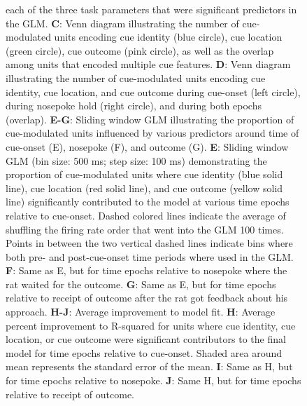 \documentclass[11pt]{article}
\newcommand{\bsf}[1]{\textbf{#1}}
\begin{document}
{\begin{figure}[h]
{each of the three task parameters that were significant predictors in the
GLM. \bsf{C}: Venn diagram illustrating the number of cue-modulated units encoding cue identity (blue circle), cue location (green circle), cue outcome (pink circle), as well as the overlap among units that encoded multiple cue features. \bsf{D}: Venn diagram illustrating the number of cue-modulated units encoding cue identity, cue location, and cue outcome during cue-onset (left circle), during nosepoke hold (right circle), and during both epochs (overlap). \bsf{E-G}: Sliding window GLM illustrating the proportion of cue-modulated units influenced by various predictors around time of cue-onset (E), nosepoke (F), and outcome (G). \bsf{E}: Sliding window GLM (bin size: 500 ms; step size: 100 ms) demonstrating the proportion of cue-modulated units where cue identity (blue solid line), cue location (red solid line), and cue outcome (yellow solid line) significantly contributed to the model at various time epochs relative to cue-onset. Dashed colored lines indicate the average of shuffling the firing rate order that went into the GLM 100 times. Points in between the two vertical dashed lines indicate bins where both pre- and post-cue-onset time periods where used in the GLM. \bsf{F}: Same as E, but for time epochs relative to nosepoke where the rat waited for the outcome. \bsf{G}: Same as E, but for time epochs relative to receipt of outcome after the rat got feedback about his approach. \bsf{H-J}: Average improvement to model fit. \bsf{H}: Average percent improvement to R-squared for units where cue identity, cue location, or cue outcome were significant contributors to the final model for time epochs relative to cue-onset. Shaded area around mean represents the standard error of the mean. \bsf{I}: Same as H, but for time epochs relative to nosepoke. \bsf{J}: Same H, but for time epochs relative to receipt of outcome.}
\label{fig:NP_GLM}
\end{figure}

}
\end{document}
